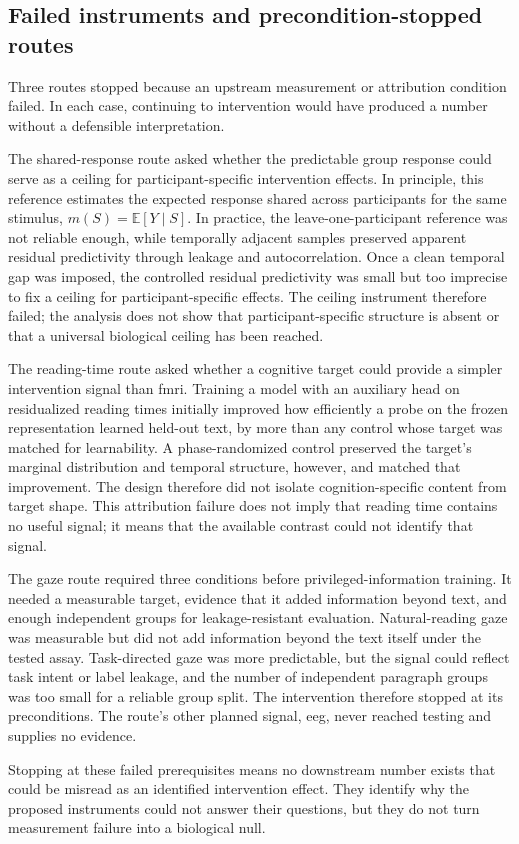 \subsection{Failed instruments and precondition-stopped routes}

Three routes stopped because an upstream measurement or attribution condition failed.
In each case, continuing to intervention would have produced a number without a defensible interpretation.

The shared-response route asked whether the predictable group response could serve as a ceiling for participant-specific intervention effects.
In principle, this reference estimates the expected response shared across participants for the same stimulus, $m(S)=\mathbb{E}[Y\mid S]$.
In practice, the leave-one-participant reference was not reliable enough, while temporally adjacent samples preserved apparent residual predictivity through leakage and autocorrelation.
Once a clean temporal gap was imposed, the controlled residual predictivity was small but too imprecise to fix a ceiling for participant-specific effects.
The ceiling instrument therefore failed; the analysis does not show that participant-specific structure is absent or that a universal biological ceiling has been reached. 

The reading-time route asked whether a cognitive target could provide a simpler intervention signal than \ac{fmri}.
Training a model with an auxiliary head on residualized reading times initially improved how efficiently a probe on the frozen representation learned held-out text, by more than any control whose target was matched for learnability.
A phase-randomized control preserved the target's marginal distribution and temporal structure, however, and matched that improvement.
The design therefore did not isolate cognition-specific content from target shape.
This attribution failure does not imply that reading time contains no useful signal; it means that the available contrast could not identify that signal. 

The gaze route required three conditions before privileged-information training.
It needed a measurable target, evidence that it added information beyond text, and enough independent groups for leakage-resistant evaluation.
Natural-reading gaze was measurable but did not add information beyond the text itself under the tested assay.
Task-directed gaze was more predictable, but the signal could reflect task intent or label leakage, and the number of independent paragraph groups was too small for a reliable group split.
The intervention therefore stopped at its preconditions.
The route's other planned signal, \ac{eeg}, never reached testing and supplies no evidence. 

Stopping at these failed prerequisites means no downstream number exists that could be misread as an identified intervention effect.
They identify why the proposed instruments could not answer their questions, but they do not turn measurement failure into a biological null.

